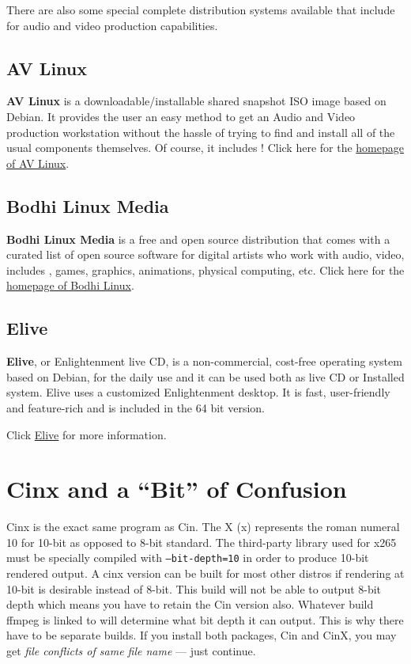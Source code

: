 There are also some special complete distribution systems
available that include \CGG{} for audio and video production
capabilities.

\subsection{AV Linux}
\label{sec:AV_Linux}

\textbf{AV Linux} is a downloadable/installable shared snapshot
ISO image based on Debian.  It provides the user an easy method to
get an Audio and Video production workstation without the hassle
of trying to find and install all of the usual components
themselves.  Of course, it includes \CGG{}!
%
Click here for the
\href{http://www.bandshed.net/avlinux/}{homepage of AV Linux}.

\subsection{Bodhi Linux Media}
\label{sec:Bodhi_Linux}

\textbf{Bodhi Linux Media} is a free and open source distribution that
comes with a curated list of open source software for digital
artists who work with audio, video, includes \CGG{}, games,
graphics, animations, physical computing, etc.
%
Click here for the
\href{https://gitlab.com/giuseppetorre/bodhilinuxmedia}{homepage of Bodhi Linux}.

\subsection{Elive}
\label{sec:elive}

\textbf{Elive}, or Enlightenment live CD, is a non-commercial, cost-free operating system based on Debian, for the daily use and it can be used both as live CD or Installed system. Elive uses a customized Enlightenment desktop. It is fast, user-friendly and feature-rich and \CGG{} is included in the 64 bit version.

Click \href{https://www.elivecd.org/}{Elive} for more information.

\section{Cinx and a “Bit” of Confusion}%
\label{sec:cinx_and_a_bit_of_confusion}

Cinx is the exact same program as Cin.  The X (x) represents the
roman numeral 10 for 10-bit as opposed to 8-bit standard.  The
third-party library used for x265 must be specially compiled with
\texttt{--bit-depth=10} in order to produce 10-bit rendered
output.  A cinx version can be built for most other distros if 
rendering at 10-bit is desirable instead of 8-bit.
%
This build will not be able to output 8-bit depth which means you
have to retain the Cin version also.
%
Whatever build ffmpeg is linked to will determine what bit depth
it can output.  This is why there have to be separate builds.  If
you install both packages, Cin and CinX, you may get \textit{file
  conflicts of same file name} --- just continue.

